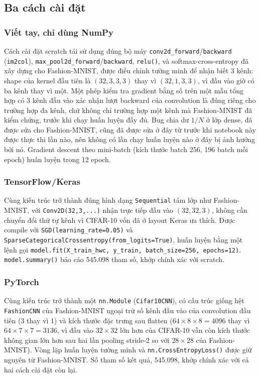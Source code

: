 \documentclass[11pt]{article}
\newcommand{\code}[1]{\texttt{#1}}
\begin{document}
\subsection{Ba cách cài đặt}

\subsubsection{Viết tay, chỉ dùng NumPy}

Cách cài đặt scratch tái sử dụng đúng bộ máy
\code{conv2d\_forward}/\code{backward} (\code{im2col}),
\code{max\_pool2d\_forward}/\code{backward}, \code{relu()}, và
softmax-cross-entropy đã xây dựng cho Fashion-MNIST, được điều chỉnh tường
minh để nhận biết 3 kênh: shape của kernel đầu tiên là $(32, 3, 3, 3)$
thay vì $(32, 1, 3, 3)$, vì đầu vào giờ có ba kênh thay vì một. Một phép
kiểm tra gradient bằng số trên một mẫu tổng hợp có 3 kênh đầu vào xác nhận
lượt backward của convolution là đúng riêng cho trường hợp đa kênh, chứ
không chỉ trường hợp một kênh mà Fashion-MNIST đã kiểm chứng, trước khi
chạy huấn luyện đầy đủ. Bug chia dư $1/N$ ở lớp dense, đã được sửa cho
Fashion-MNIST, cũng đã được sửa ở đây từ trước khi notebook này được thực
thi lần nào, nên không có lần chạy huấn luyện nào ở đây bị ảnh hưởng bởi
nó. Gradient descent theo mini-batch (kích thước batch 256, 196 batch mỗi
epoch) huấn luyện trong 12 epoch.

\subsubsection{TensorFlow/Keras}

Cùng kiến trúc trở thành đúng hình dạng \code{Sequential} tám lớp như
Fashion-MNIST, với \code{Conv2D(32,3,...)} nhận trực tiếp đầu vào
$(32,32,3)$, không cần chuyển đổi thứ tự kênh vì CIFAR-10 vốn đã ở layout
Keras ưa thích. Được compile với \code{SGD(learning\_rate=0.05)} và
\code{SparseCategoricalCrossentropy(from\_logits=True)}, huấn luyện bằng
một lệnh gọi \code{model.fit(X\_train\_hwc, y\_train, batch\_size=256,
epochs=12)}. \code{model.summary()} báo cáo 545.098 tham số, khớp chính
xác với scratch.

\subsubsection{PyTorch}

Cùng kiến trúc trở thành một \code{nn.Module} (\code{Cifar10CNN}), có cấu
trúc giống hệt \code{FashionCNN} của Fashion-MNIST ngoại trừ số kênh đầu
vào của convolution đầu tiên (3 thay vì 1) và kích thước đặc trưng sau
flatten ($64 \times 8 \times 8 = 4096$ thay vì $64 \times 7 \times 7 =
3136$, vì đầu vào $32\times32$ lớn hơn của CIFAR-10 vẫn còn kích thước
không gian lớn hơn sau hai lần pooling stride-2 so với $28\times28$ của
Fashion-MNIST). Vòng lặp huấn luyện tường minh và \code{nn.CrossEntropyLoss()}
được giữ nguyên từ Fashion-MNIST. Số tham số kết quả, 545.098, khớp chính
xác với cả hai cách cài đặt còn lại.
\end{document}
